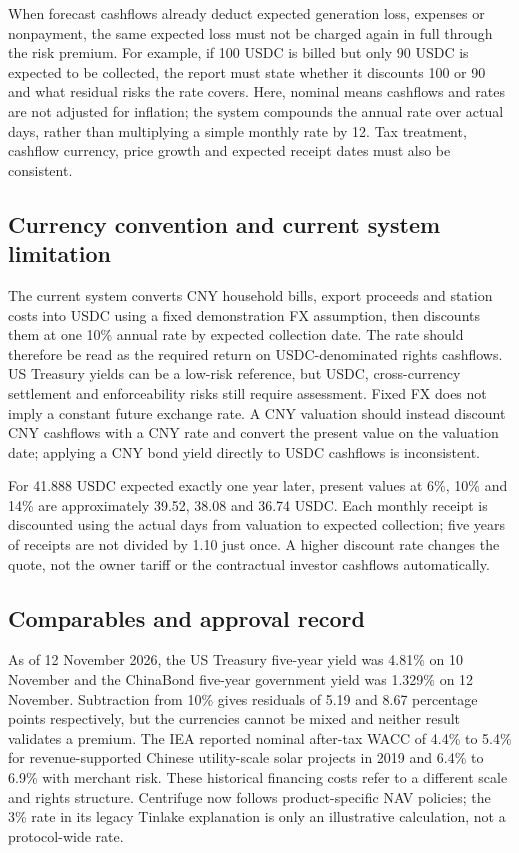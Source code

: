 \documentclass[12pt,a4paper]{article}
\begin{document}
When forecast cashflows already deduct expected generation loss, expenses or nonpayment, the same expected loss must not be charged again in full through the risk premium. For example, if 100 USDC is billed but only 90 USDC is expected to be collected, the report must state whether it discounts 100 or 90 and what residual risks the rate covers. Here, nominal means cashflows and rates are not adjusted for inflation; the system compounds the annual rate over actual days, rather than multiplying a simple monthly rate by 12. Tax treatment, cashflow currency, price growth and expected receipt dates must also be consistent.

\subsection{Currency convention and current system limitation}
The current system converts CNY household bills, export proceeds and station costs into USDC using a fixed demonstration FX assumption, then discounts them at one 10\% annual rate by expected collection date. The rate should therefore be read as the required return on USDC-denominated rights cashflows. US Treasury yields can be a low-risk reference, but USDC, cross-currency settlement and enforceability risks still require assessment. Fixed FX does not imply a constant future exchange rate. A CNY valuation should instead discount CNY cashflows with a CNY rate and convert the present value on the valuation date; applying a CNY bond yield directly to USDC cashflows is inconsistent.

For 41.888 USDC expected exactly one year later, present values at 6\%, 10\% and 14\% are approximately 39.52, 38.08 and 36.74 USDC. Each monthly receipt is discounted using the actual days from valuation to expected collection; five years of receipts are not divided by 1.10 just once. A higher discount rate changes the quote, not the owner tariff or the contractual investor cashflows automatically.

\subsection{Comparables and approval record}
As of 12 November 2026, the US Treasury five-year yield was 4.81\% on 10 November and the ChinaBond five-year government yield was 1.329\% on 12 November. Subtraction from 10\% gives residuals of 5.19 and 8.67 percentage points respectively, but the currencies cannot be mixed and neither result validates a premium. The IEA reported nominal after-tax WACC of 4.4\% to 5.4\% for revenue-supported Chinese utility-scale solar projects in 2019 and 6.4\% to 6.9\% with merchant risk. These historical financing costs refer to a different scale and rights structure. Centrifuge now follows product-specific NAV policies; the 3\% rate in its legacy Tinlake explanation is only an illustrative calculation, not a protocol-wide rate.
\end{document}
